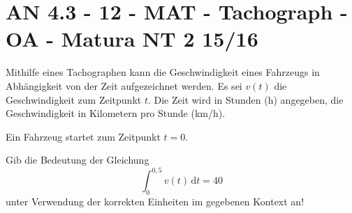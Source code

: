 \section{AN 4.3 - 12 - MAT - Tachograph - OA - Matura NT 2 15/16}

\begin{beispiel}[AN 4.3]{1} %
Mithilfe eines Tachographen kann die Geschwindigkeit eines Fahrzeugs in Abhängigkeit von der Zeit aufgezeichnet werden. Es sei $v(t)$ die Geschwindigkeit zum Zeitpunkt $t$. Die Zeit wird in Stunden (h) angegeben, die Geschwindigkeit in Kilometern pro Stunde (km/h).

Ein Fahrzeug startet zum Zeitpunkt $t=0$.

Gib die Bedeutung der Gleichung $$\int^{0,5}_0{v(t)}\,\text{d}t=40$$ unter Verwendung der korrekten Einheiten im gegebenen Kontext an!\leer

\end{beispiel}